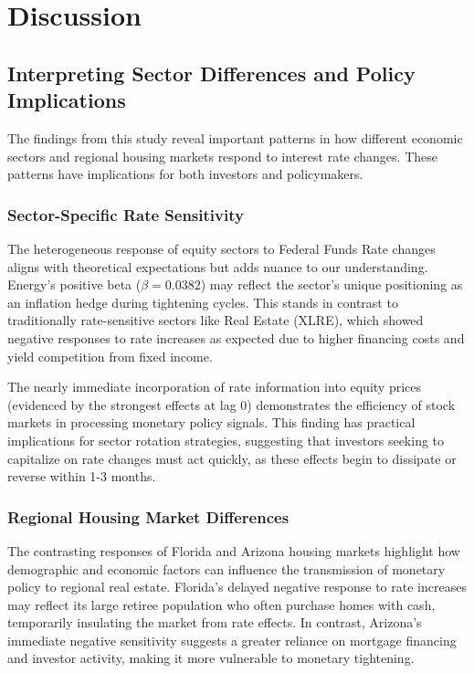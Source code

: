 \documentclass[12pt, stu, abstract]{apa7}
\begin{document}
\section{Discussion}
\subsection{Interpreting Sector Differences and Policy Implications}
The findings from this study reveal important patterns in how different economic sectors and regional housing markets respond to interest rate changes. These patterns have implications for both investors and policymakers.

\subsubsection{Sector-Specific Rate Sensitivity}
The heterogeneous response of equity sectors to Federal Funds Rate changes aligns with theoretical expectations but adds nuance to our understanding. Energy's positive beta ($\beta = 0.0382$) may reflect the sector's unique positioning as an inflation hedge during tightening cycles. This stands in contrast to traditionally rate-sensitive sectors like Real Estate (XLRE), which showed negative responses to rate increases as expected due to higher financing costs and yield competition from fixed income.

The nearly immediate incorporation of rate information into equity prices (evidenced by the strongest effects at lag 0) demonstrates the efficiency of stock markets in processing monetary policy signals. This finding has practical implications for sector rotation strategies, suggesting that investors seeking to capitalize on rate changes must act quickly, as these effects begin to dissipate or reverse within 1-3 months.

\subsubsection{Regional Housing Market Differences}
The contrasting responses of Florida and Arizona housing markets highlight how demographic and economic factors can influence the transmission of monetary policy to regional real estate. Florida's delayed negative response to rate increases may reflect its large retiree population who often purchase homes with cash, temporarily insulating the market from rate effects. In contrast, Arizona's immediate negative sensitivity suggests a greater reliance on mortgage financing and investor activity, making it more vulnerable to monetary tightening.
\end{document}
